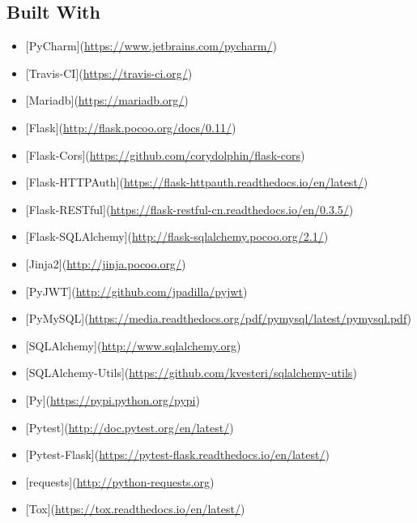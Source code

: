 \documentclass[letterpaper,10pt,english]{sphinxmanual}
\begin{document}
\subsection{Built With}
\label{\detokenize{installation:built-with}}\begin{itemize}
\item {} 
{[}PyCharm{]}(\url{https://www.jetbrains.com/pycharm/})

\item {} 
{[}Travis-CI{]}(\url{https://travis-ci.org/})

\item {} 
{[}Mariadb{]}(\url{https://mariadb.org/})

\item {} 
{[}Flask{]}(\url{http://flask.pocoo.org/docs/0.11/})

\item {} 
{[}Flask-Cors{]}(\url{https://github.com/corydolphin/flask-cors})

\item {} 
{[}Flask-HTTPAuth{]}(\url{https://flask-httpauth.readthedocs.io/en/latest/})

\item {} 
{[}Flask-RESTful{]}(\url{https://flask-restful-cn.readthedocs.io/en/0.3.5/})

\item {} 
{[}Flask-SQLAlchemy{]}(\url{http://flask-sqlalchemy.pocoo.org/2.1/})

\item {} 
{[}Jinja2{]}(\url{http://jinja.pocoo.org/})

\item {} 
{[}PyJWT{]}(\url{http://github.com/jpadilla/pyjwt})

\item {} 
{[}PyMySQL{]}(\url{https://media.readthedocs.org/pdf/pymysql/latest/pymysql.pdf})

\item {} 
{[}SQLAlchemy{]}(\url{http://www.sqlalchemy.org})

\item {} 
{[}SQLAlchemy-Utils{]}(\url{https://github.com/kvesteri/sqlalchemy-utils})

\item {} 
{[}Py{]}(\url{https://pypi.python.org/pypi})

\item {} 
{[}Pytest{]}(\url{http://doc.pytest.org/en/latest/})

\item {} 
{[}Pytest-Flask{]}(\url{https://pytest-flask.readthedocs.io/en/latest/})

\item {} 
{[}requests{]}(\url{http://python-requests.org})

\item {} 
{[}Tox{]}(\url{https://tox.readthedocs.io/en/latest/})

\end{itemize}
\end{document}
